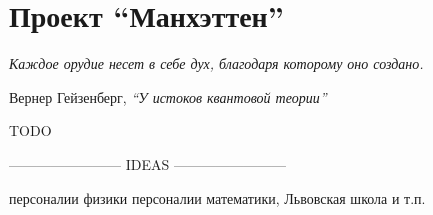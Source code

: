 \chapter{Проект ``Манхэттен''}

\epigraph{\emph{Каждое орудие несет в себе дух, \break благодаря которому оно создано.}}
{Вернер Гейзенберг, \emph{``У истоков квантовой теории''}}

TODO

------------------------ IDEAS ------------------------ 

персоналии физики
персоналии математики, Львовская школа и т.п.
